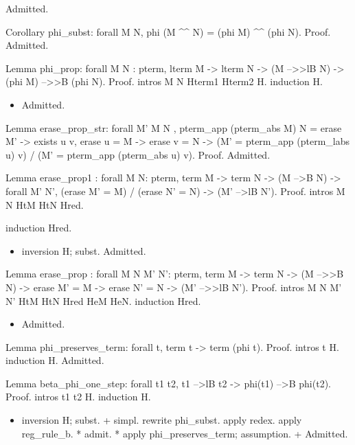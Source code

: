                   Admitted.    


Corollary phi\_subst: forall M N, phi (M \^{}\^{} N) = (phi M) \^{}\^{} (phi N). 
Proof.
  Admitted.


Lemma phi\_prop: forall M N : pterm, lterm M -> lterm N -> (M -->>lB N) -> (phi M) -->>B (phi N).
Proof.
  intros M N Hterm1 Hterm2 H.
  induction H.

\begin{itemize}
\item  Admitted.

\end{itemize}






Lemma erase\_prop\_str: forall M' M N , pterm\_app (pterm\_abs M) N = erase M' -> exists u v, erase u = M -> erase v = N -> (M' = pterm\_app (pterm\_labs u) v) / (M' = pterm\_app (pterm\_abs u) v).
Proof.
Admitted.


Lemma erase\_prop1 : forall M N: pterm, term M -> term N -> (M -->B N) -> forall M' N', (erase M' = M) / (erase N' = N) ->  (M' -->lB N').
Proof.
  intros M N HtM HtN Hred.


  induction Hred.

\begin{itemize}
\item  inversion H; subst.
       Admitted.
   
\end{itemize}


Lemma erase\_prop : forall M N M' N': pterm, term M -> term N -> (M -->>B N) -> erase M' = M -> erase N' = N ->  (M' -->>lB N').
Proof.
  intros M N M' N' HtM HtN Hred HeM HeN.
  induction Hred.

\begin{itemize}
\item  Admitted.

\end{itemize}




Lemma phi\_preserves\_term: forall t, term t -> term (phi t).
Proof.
  intros t H.
  induction H.
  Admitted.


Lemma beta\_phi\_one\_step: forall t1 t2, t1 -->lB t2 -> phi(t1) -->B phi(t2).
Proof.
  intros t1 t2 H.
  induction H.

\begin{itemize}
\item  inversion H; subst.
    + simpl.
      rewrite phi\_subst.
      apply redex.
      apply reg\_rule\_b.
      * admit.        
      * apply phi\_preserves\_term; assumption.
    + Admitted.

\end{itemize}


